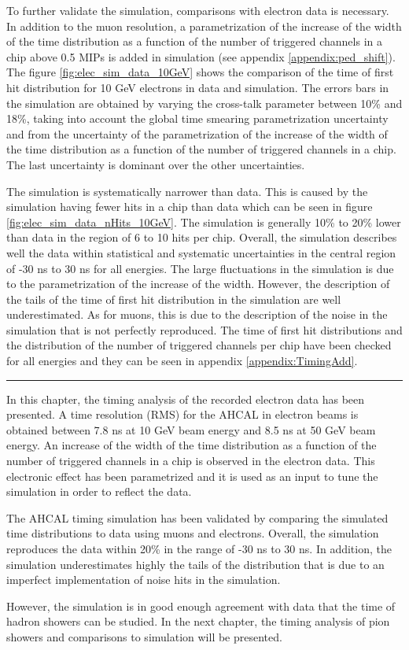 To further validate the simulation, comparisons with electron data is necessary. In addition to the muon resolution, a parametrization of the increase of the width of the time distribution as a function of the number of triggered channels in a chip above 0.5 MIPs is added in simulation (see appendix \ref{appendix:ped_shift}). The figure \ref{fig:elec_sim_data_10GeV} shows the comparison of the time of first hit distribution for 10 GeV electrons in data and simulation. The errors bars in the simulation are obtained by varying the cross-talk parameter between 10\% and 18\%, taking into account the global time smearing parametrization uncertainty and from the uncertainty of the parametrization of the increase of the width of the time distribution as a function of the number of triggered channels in a chip. The last uncertainty is dominant over the other uncertainties.

The simulation is systematically narrower than data. This is caused by the simulation having fewer hits in a chip than data which can be seen in figure \ref{fig:elec_sim_data_nHits_10GeV}. The simulation is generally 10\% to 20\% lower than data in the region of 6 to 10 hits per chip. Overall, the simulation describes well the data within statistical and systematic uncertainties in the central region of -30 ns to 30 ns for all energies. The large fluctuations in the simulation is due to the parametrization of the increase of the width. However, the description of the tails of the time of first hit distribution in the simulation are well underestimated. As for muons, this is due to the description of the noise in the simulation that is not perfectly reproduced. The time of first hit distributions and the distribution of the number of triggered channels per chip have been checked for all energies and they can be seen in appendix \ref{appendix:TimingAdd}.

\begin{center}
	\rule{0.5\textwidth}{.4pt}
\end{center}

In this chapter, the timing analysis of the recorded electron data has been presented. A time resolution (RMS) for the AHCAL in electron beams is obtained between 7.8 ns at 10 GeV beam energy and 8.5 ns at 50 GeV beam energy. An increase of the width of the time distribution as a function of the number of triggered channels in a chip is observed in the electron data. This electronic effect has been parametrized and it is used as an input to tune the simulation in order to reflect the data.

The AHCAL timing simulation has been validated by comparing the simulated time distributions to data using muons and electrons. Overall, the simulation reproduces the data within 20\% in the range of -30 ns to 30 ns. In addition, the simulation underestimates highly the tails of the distribution that is due to an imperfect implementation of noise hits in the simulation.

However, the simulation is in good enough agreement with data that the time of hadron showers can be studied. In the next chapter, the timing analysis of pion showers and comparisons to simulation will be presented.
